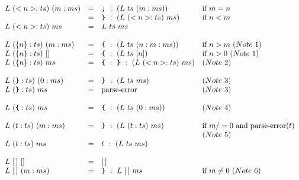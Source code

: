 \begin{center}
\[\ba{lcll}
     L~ (<n>:ts)~ (m:ms)   & = & \mbox{\tt ;} ~:~ (L~ ts~(m:ms))           &\mbox{if}~ m = n \\
                           & = & \mbox{\tt {\char'175}} ~:~ (L~ (<n>:ts)~ ms)       & \mbox{if}~ n < m \\
     L~ (<n>:ts)~ms        & = & L~ ts~ms \\
\\
     L~ (\{n\}:ts)~ (m:ms)   & = & \mbox{\tt {\char'173}} ~:~ (L~ ts~(n:m:ms))      & \mbox{if}~n > m~   (Note~ 1)\\
     L~ (\{n\}:ts)~ []       & = & \mbox{\tt {\char'173}} ~:~ (L~ ts~[n])           & \mbox{if}~n > 0~   (Note~ 1)\\
     L~ (\{n\}:ts)~ ms       & = & \mbox{\tt {\char'173}} ~:~ \mbox{\tt {\char'175}} ~:~  (L~ (<n>:ts)~ms) & (Note~ 2)\\
\\
     L~ (\mbox{\tt {\char'175}}:ts)~ (0:ms)     & = & \mbox{\tt {\char'175}} ~:~ (L~ ts~ms)           & (Note~ 3) \\
     L~ (\mbox{\tt {\char'175}}:ts)~ ms         & = & \mbox{parse-error}           & (Note~ 3) \\
     
\\
     L~ (\mbox{\tt {\char'173}}:ts)~ ms         & = & \mbox{\tt {\char'173}} ~:~ (L~ ts~(0:ms))       &     (Note~ 4)\\
\\
     L~ (t:ts)~ (m:ms)       & = & \mbox{\tt {\char'175}} ~:~ (L~ (t:ts)~ ms)      & \mbox{if}~ m /= 0 ~\mbox{and}~ \mbox{parse-error}(t) \\
                                                                    &&& (Note~ 5) \\
     L~ (t:ts)~ ms           & = & t ~:~ (L~ ts~ms)\\
\\
     L~ \emptystr~ []              & = & \emptystr\\
     L~ \emptystr~ (m:ms)          & = & \mbox{\tt {\char'175}} ~:~ L~ \emptystr~ ms          & \mbox{if}~m \neq 0~  (Note~ 6)
\ea\]
\end{center}
